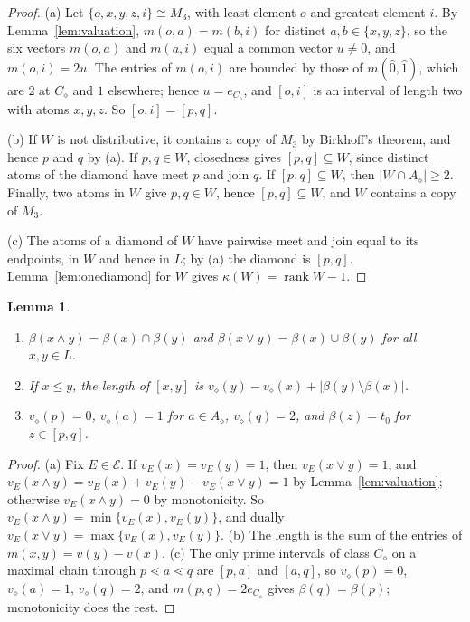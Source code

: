 \documentclass{amsart}
\newtheorem{lemma}[theorem]{Lemma}
\theoremstyle{definition}
\DeclareMathOperator{\rk}{rank}
\newcommand{\cE}{\mathcal E}
\newcommand{\dm}{\diamond}
\begin{document}
\begin{proof}
	(a) Let $\{o,x,y,z,i\}\cong M_3$, with least element $o$ and greatest element $i$. By Lemma~\ref{lem:valuation}, $m(o,a)=m(b,i)$ for distinct $a,b\in\{x,y,z\}$, so the six vectors $m(o,a)$ and $m(a,i)$ equal a common vector $u\ne0$, and $m(o,i)=2u$. The entries of $m(o,i)$ are bounded by those of $m(\hat0,\hat1)$, which are $2$ at $C_\dm$ and $1$ elsewhere; hence $u=e_{C_\dm}$, and $[o,i]$ is an interval of length two with atoms $x,y,z$. So $[o,i]=[p,q]$.

	(b) If $W$ is not distributive, it contains a copy of $M_3$ by Birkhoff's theorem, and hence $p$ and $q$ by (a). If $p,q\in W$, closedness gives $[p,q]\subseteq W$, since distinct atoms of the diamond have meet $p$ and join $q$. If $[p,q]\subseteq W$, then $|W\cap A_\dm|\ge2$. Finally, two atoms in $W$ give $p,q\in W$, hence $[p,q]\subseteq W$, and $W$ contains a copy of $M_3$.

	(c) The atoms of a diamond of $W$ have pairwise meet and join equal to its endpoints, in $W$ and hence in $L$; by (a) the diamond is $[p,q]$. Lemma~\ref{lem:onediamond} for $W$ gives $\kappa(W)=\rk W-1$.
\end{proof}

\begin{lemma}\label{lem:beta}
	\begin{enumerate}
		\item[(a)] $\beta(x\wedge y)=\beta(x)\cap\beta(y)$ and $\beta(x\vee y)=\beta(x)\cup\beta(y)$ for all $x,y\in L$.
		\item[(b)] If $x\le y$, the length of $[x,y]$ is $v_\dm(y)-v_\dm(x)+|\beta(y)\setminus\beta(x)|$.
		\item[(c)] $v_\dm(p)=0$, $v_\dm(a)=1$ for $a\in A_\dm$, $v_\dm(q)=2$, and $\beta(z)=t_0$ for $z\in[p,q]$.
	\end{enumerate}
\end{lemma}

\begin{proof}
	(a) Fix $E\in\cE$. If $v_E(x)=v_E(y)=1$, then $v_E(x\vee y)=1$, and $v_E(x\wedge y)=v_E(x)+v_E(y)-v_E(x\vee y)=1$ by Lemma~\ref{lem:valuation}; otherwise $v_E(x\wedge y)=0$ by monotonicity. So $v_E(x\wedge y)=\min\{v_E(x),v_E(y)\}$, and dually $v_E(x\vee y)=\max\{v_E(x),v_E(y)\}$. (b) The length is the sum of the entries of $m(x,y)=v(y)-v(x)$. (c) The only prime intervals of class $C_\dm$ on a maximal chain through $p\lessdot a\lessdot q$ are $[p,a]$ and $[a,q]$, so $v_\dm(p)=0$, $v_\dm(a)=1$, $v_\dm(q)=2$, and $m(p,q)=2e_{C_\dm}$ gives $\beta(q)=\beta(p)$; monotonicity does the rest.
\end{proof}
\end{document}
